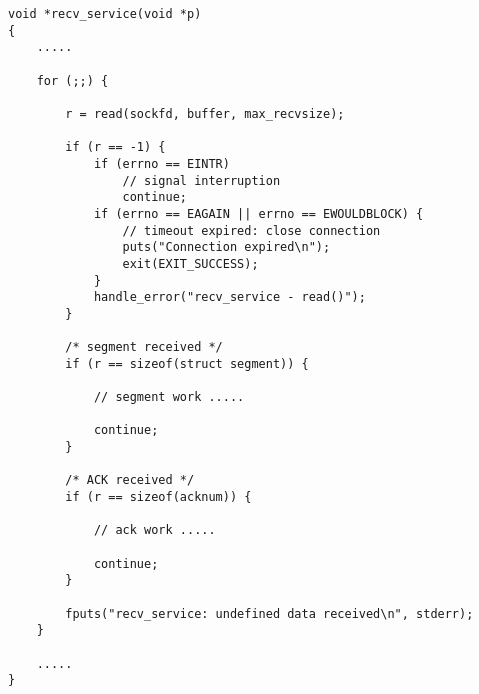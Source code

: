 \begin{lstlisting}[title=transport.c]
void *recv_service(void *p)
{
	.....

    for (;;) {

        r = read(sockfd, buffer, max_recvsize);

        if (r == -1) {
            if (errno == EINTR)
                // signal interruption
                continue;
            if (errno == EAGAIN || errno == EWOULDBLOCK) {
                // timeout expired: close connection
                puts("Connection expired\n");
                exit(EXIT_SUCCESS);
            }
            handle_error("recv_service - read()");
        }

        /* segment received */
        if (r == sizeof(struct segment)) {

            // segment work .....
            
            continue;
        }

        /* ACK received */
        if (r == sizeof(acknum)) {

            // ack work .....

            continue;
        }

        fputs("recv_service: undefined data received\n", stderr);
    }

	.....
}
\end{lstlisting}
